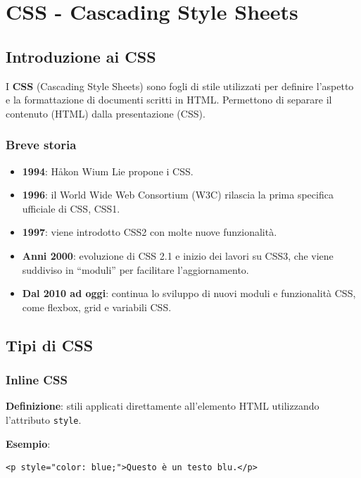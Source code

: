 \chapter{CSS - Cascading Style Sheets}

\section{Introduzione ai CSS}

I \textbf{CSS} (Cascading Style Sheets) sono fogli di stile utilizzati per definire l'aspetto e la formattazione di documenti scritti in HTML. Permettono di separare il contenuto (HTML) dalla presentazione (CSS).

\subsection{Breve storia}

\begin{itemize}
    \item \textbf{1994}: Håkon Wium Lie propone i CSS.
    \item \textbf{1996}: il World Wide Web Consortium (W3C) rilascia la prima specifica ufficiale di CSS, CSS1.
    \item \textbf{1997}: viene introdotto CSS2 con molte nuove funzionalità.
    \item \textbf{Anni 2000}: evoluzione di CSS 2.1 e inizio dei lavori su CSS3, che viene suddiviso in ``moduli'' per facilitare l'aggiornamento.
    \item \textbf{Dal 2010 ad oggi}: continua lo sviluppo di nuovi moduli e funzionalità CSS, come flexbox, grid e variabili CSS.
\end{itemize}

\section{Tipi di CSS}

\subsection{Inline CSS}

\textbf{Definizione}: stili applicati direttamente all'elemento HTML utilizzando l'attributo \texttt{style}.

\textbf{Esempio}:
\begin{lstlisting}[language=HTML5]
<p style="color: blue;">Questo è un testo blu.</p>
\end{lstlisting}

